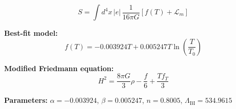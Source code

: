 
\begin{equation}
  S = \int d^4x \, |e| \, \frac{1}{16\pi G} \left[ f(T) + \mathcal{L}_m \right]
\end{equation}

\textbf{Best-fit model:}
\begin{equation}
  f(T) = -0.003924 T + 0.005247 T \ln\!\left(\frac{T}{T_0}\right)
\end{equation}

\textbf{Modified Friedmann equation:}
\begin{equation}
  H^2 = \frac{8\pi G}{3} \rho - \frac{f}{6} + \frac{T f_T}{3}
\end{equation}

\textbf{Parameters:}
$\alpha = -0.003924$, \quad
$\beta = 0.005247$, \quad
$n = 0.8005$, \quad
$\Lambda_{\text{BI}} = 534.9615$